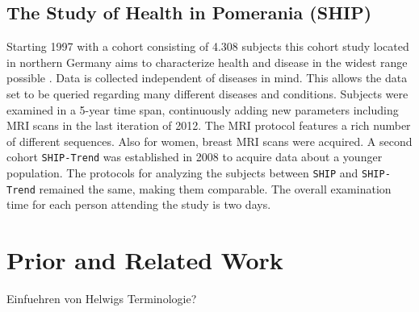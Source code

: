 \documentclass[journal]{style/vgtc}           %
\begin{document}
\subsection{The Study of Health in Pomerania (SHIP)}
Starting 1997 with a cohort consisting of 4.308 subjects this cohort study located in northern Germany aims to characterize health and disease in the widest range possible \cite{Volzke2011}.
%
Data is collected independent of diseases in mind.
%
This allows the data set to be queried regarding many different diseases and conditions.
%
Subjects were examined in a 5-year time span, continuously adding new parameters including MRI scans in the last iteration of 2012.
%
The MRI protocol features a rich number of different sequences.
%
Also for women, breast MRI scans were acquired.
%
A second cohort \texttt{SHIP-Trend} was established in 2008 to acquire data about a younger population.
%
The protocols for analyzing the subjects between \texttt{SHIP} and \texttt{SHIP-Trend} remained the same, making them comparable.
%
The overall examination time for each person attending the study is two days.

\section{Prior and Related Work}
Einfuehren von Helwigs Terminologie?
\end{document}
